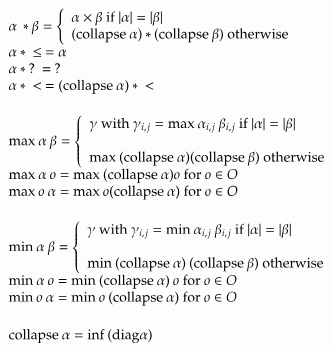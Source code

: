 \[
\begin{array}{ll}
\alpha \: * \beta = \left\{ \begin{array}{l}
                          \alpha \times \beta \mbox{ if } \vert \alpha \vert = \vert \beta \vert \\
                          (\coll \alpha) * (\coll \beta) \mbox{ otherwise}  
                          \end{array}\right. \\
\alpha \: * \: \leq \: = \alpha \\
\alpha \: * \: ? \:    = \: ? \\
\alpha \: * \: < \:    = (\coll \alpha) \: * \: < \\

\vs\\
\maxo \alpha \: \beta =  \left\{ \begin{array}{l}
                          \gamma \mbox{ with } \gamma_{i,j} = \maxo \alpha_{i,j} \: \beta_{i,j} \mbox{ if } \vert\alpha\vert = \vert\beta\vert \\
\\
                          \maxo (\coll \alpha) (\coll \beta) \mbox{ otherwise}  
                          \end{array}\right. \\
\maxo \alpha \: o = \maxo (\coll \alpha) o \mbox{ for } o \in O\\
\maxo o \: \alpha = \maxo o (\coll \alpha) \mbox{ for } o \in O\\

\vs\\
\mino \alpha  \: \beta =  \left\{ \begin{array}{l}
                          \gamma \mbox{ with } \gamma_{i,j} = \mino \alpha_{i,j} \: \beta_{i,j} \mbox{ if } \vert\alpha\vert = \vert\beta\vert \\
\\  
                        \mino (\coll \alpha) \: (\coll \beta) \mbox{ otherwise}  
                          \end{array}\right. \\
\mino \alpha \: o = \mino (\coll \alpha) \: o \mbox{ for } o \in O\\
\mino o \: \alpha = \mino o \: (\coll \alpha) \mbox{ for } o \in O\\

\vs\\
\coll \alpha = \info (\diag \alpha) 
\end{array}
\]


